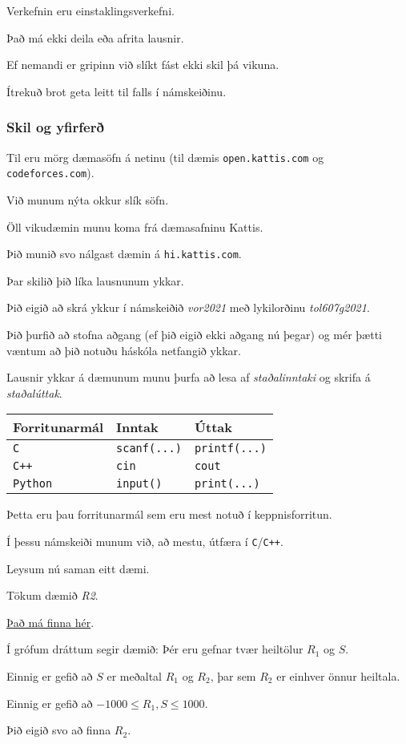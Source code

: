 {
	{
		\item<1-> Verkefnin eru einstaklingsverkefni.
		\item<2-> Það má ekki deila eða afrita lausnir.
		\item<3-> Ef nemandi er gripinn við slíkt fást ekki skil þá vikuna.
		\item<4-> Ítrekuð brot geta leitt til falls í námskeiðinu.
	}
}

{
	\frametitle{Skil og yfirferð}
	{
		\item<1-> Til eru mörg dæmasöfn á netinu (til dæmis \texttt{open.kattis.com} og \texttt{codeforces.com}).
		\item<2-> Við munum nýta okkur slík söfn.
		\item<3-> Öll vikudæmin munu koma frá dæmasafninu Kattis.
		\item<4-> Þið munið svo nálgast dæmin á \texttt{hi.kattis.com}.
		\item<5-> Þar skilið þið líka lausnunum ykkar.
		\item<6-> Þið eigið að skrá ykkur í námskeiðið \emph{vor2021} með lykilorðinu \emph{tol607g2021}.
		\item<7-> Þið þurfið að stofna aðgang (ef þið eigið ekki aðgang nú þegar) og mér þætti væntum að þið notuðu háskóla netfangið ykkar.
	}
}

{
	{
		\item<1-> Lausnir ykkar á dæmunum munu þurfa að lesa af \emph{staðalinntaki} og skrifa á \emph{staðalúttak}.
		\pause

		\begin{tabular}{l l l}
			Forritunarmál & Inntak & Úttak\\
			\hline
			\texttt{C} & \texttt{scanf(...)} & \texttt{printf(...)}\\
			\texttt{C++} & \texttt{cin} & \texttt{cout}\\
			\texttt{Python} & \texttt{input()} & \texttt{print(...)}
		\end{tabular}

		\item<3-> Þetta eru þau forritunarmál sem eru mest notuð í keppnisforritun.
		\item<4-> Í þessu námskeiði munum við, að mestu, útfæra í \texttt{C}/\texttt{C++}.
		\item<5-> Leysum nú saman eitt dæmi.
	}
}

{
	{
		\item<1-> Tökum dæmið \emph{R2}.
		\item<2-> \href{https://hi.kattis.com/problems/r2}{Það má finna hér}.
		\item<3-> Í grófum dráttum segir dæmið: Þér eru gefnar tvær heiltölur $R_1$ og $S$.
		\item<4-> Einnig er gefið að $S$ er meðaltal $R_1$ og $R_2$, þar sem $R_2$ er einhver önnur heiltala.
		\item<5-> Einnig er gefið að $-1000 \leq R_1, S \leq 1000$.
		\item<6-> Þið eigið svo að finna $R_2$.
	}
}

